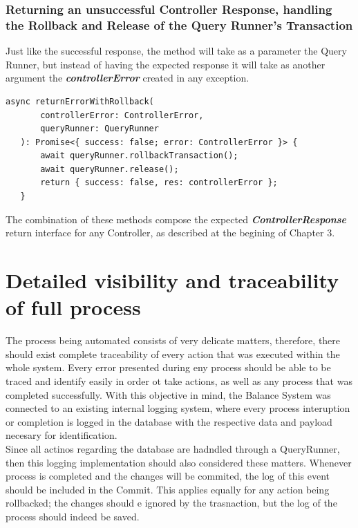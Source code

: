 \subsubsection{Returning an unsuccessful Controller Response, handling the Rollback and Release of the Query Runner's Transaction}


Just like the successful response, the method will take as a parameter the Query Runner, but instead of having the expected response it will take as another argument the \textbf{\textit{controllerError}} created in any exception.

\begin{verbatim}
async returnErrorWithRollback(
       controllerError: ControllerError,
       queryRunner: QueryRunner
   ): Promise<{ success: false; error: ControllerError }> {
       await queryRunner.rollbackTransaction();
       await queryRunner.release();
       return { success: false, res: controllerError };
   }
\end{verbatim}

The combination of these methods compose the expected \textbf{\textit{ControllerResponse}} return interface for any Controller, as described at the begining of Chapter 3.

\section{Detailed visibility and traceability of full process}

The process being automated consists of very delicate matters, therefore, there should exist complete traceability of every action that was executed within the whole system. Every error presented during eny process should be able to be traced and identify easily in order ot take actions, as well as any process that was completed successfully. With this objective in mind, the Balance System was connected to an existing internal logging system, where every process interuption or completion is logged in the database with the respective data and payload necesary for identification.\\

Since all actinos regarding the database are hadndled through a QueryRunner, then this logging implementation should also considered these matters. Whenever process is completed and the changes will be commited, the log of this event should be included in the Commit. This applies equally for any action being rollbacked; the changes should e ignored by the trasnaction, but the log of the process should indeed be saved.

